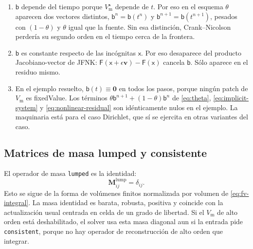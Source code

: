 \documentclass[11pt,a4paper]{article}
\newcommand{\code}[1]{\texttt{\small #1}}
\newcommand{\Vm}{V_{\text{m}}}
\newcommand{\Mmass}{\mathbf{M}}
\newcommand{\Fres}{\mathsf{F}}
\begin{document}
\begin{enumerate}
\item $\mathsf{b}$ depende del tiempo porque $\Vm^\star$ depende de $t$. Por eso en el esquema $\theta$ aparecen dos vectores distintos, $\mathsf{b}^n=\mathsf{b}(t^n)$ y $\mathsf{b}^{n+1}=\mathsf{b}(t^{n+1})$, pesados con $(1-\theta)$ y $\theta$ igual que la fuente. Sin esa distinción, Crank–Nicolson perdería su segundo orden en el tiempo cerca de la frontera.
\item $\mathsf{b}$ es constante respecto de las incógnitas $\mathsf{x}$. Por eso desaparece del producto Jacobiano-vector de JFNK: $\Fres(\mathsf{x}+\epsilon\mathbf{v})-\Fres(\mathsf{x})$ cancela $\mathsf{b}$. Sólo aparece en el residuo mismo.
\item En el ejemplo resuelto, $\mathsf{b}(t)\equiv\mathbf{0}$ en todos los pasos, porque ningún patch de $V_\text{m}$ es fixedValue. Los términos $\theta\mathsf{b}^{n+1}+(1-\theta)\mathsf{b}^{n}$ de \eqref{eq:theta}, \eqref{eq:implicit-system} y \eqref{eq:nonlinear-residual} son idénticamente nulos en el ejemplo. La maquinaria está para el caso Dirichlet, que sí se ejercita en otras variantes del caso.
\end{enumerate}


\subsection{Matrices de masa lumped y consistente}

El operador de masa \code{lumped} es la identidad:
\begin{equation}
  \Mmass^{\mathrm{lump}}_{ij}
  =
  \delta_{ij}.
  \label{eq:lumped}
\end{equation}
Esto se sigue de la forma de volúmenes finitos normalizada por volumen de
\eqref{eq:fv-integral}. La masa identidad es barata, robusta, positiva y coincide con la actualización usual centrada
en celda de un grado de libertad. Si el $\Vm$ de alto orden está deshabilitado, el solver
usa esta masa diagonal aun si la entrada pide \code{consistent}, porque no hay operador de
reconstrucción de alto orden que integrar.
\end{document}
